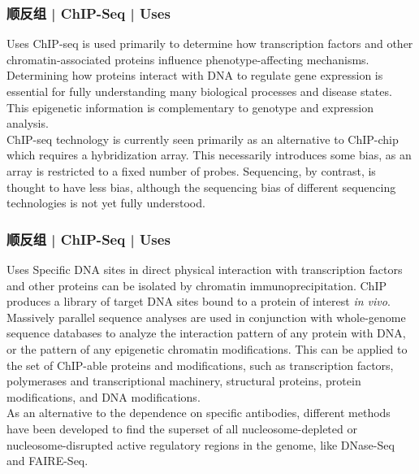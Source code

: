 \begin{frame}
  \frametitle{顺反组 | ChIP-Seq | Uses}
  \begin{block}{Uses}
    ChIP-seq is used primarily to determine how transcription factors and other chromatin-associated proteins influence phenotype-affecting mechanisms. Determining how proteins interact with DNA to regulate gene expression is essential for fully understanding many biological processes and disease states. This epigenetic information is complementary to genotype and expression analysis.\\
    \vspace{1em}
    ChIP-seq technology is currently seen primarily as an alternative to ChIP-chip which requires a hybridization array. This necessarily introduces some bias, as an array is restricted to a fixed number of probes. Sequencing, by contrast, is thought to have less bias, although the sequencing bias of different sequencing technologies is not yet fully understood.\\
  \end{block}
\end{frame}

\begin{frame}
  \frametitle{顺反组 | ChIP-Seq | Uses}
  {\footnotesize
  \begin{block}{Uses}
    Specific DNA sites in direct physical interaction with transcription factors and other proteins can be isolated by chromatin immunoprecipitation. ChIP produces a library of target DNA sites bound to a protein of interest \textit{in vivo}.\\
    \vspace{1em}
    Massively parallel sequence analyses are used in conjunction with whole-genome sequence databases to analyze the interaction pattern of any protein with DNA, or the pattern of any epigenetic chromatin modifications. This can be applied to the set of ChIP-able proteins and modifications, such as transcription factors, polymerases and transcriptional machinery, structural proteins, protein modifications, and DNA modifications.\\
    \vspace{1em}
    As an alternative to the dependence on specific antibodies, different methods have been developed to find the superset of all nucleosome-depleted or nucleosome-disrupted active regulatory regions in the genome, like DNase-Seq and FAIRE-Seq.
  \end{block}
  }
\end{frame}

